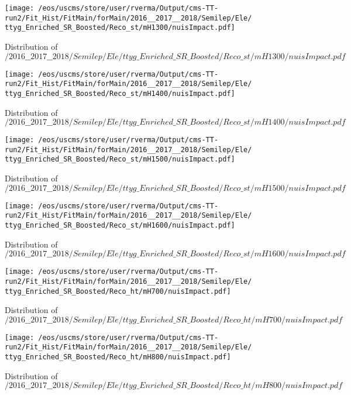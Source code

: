 \begin{figure}
\centering
\texttt{[image: /eos/uscms/store/user/rverma/Output/cms-TT-run2/Fit\_Hist/FitMain/forMain/2016\_\_2017\_\_2018/Semilep/Ele/ttyg\_Enriched\_SR\_Boosted/Reco\_st/mH1300/nuisImpact.pdf]}
\caption{Distribution of $/2016\_\_2017\_\_2018/Semilep/Ele/ttyg\_Enriched\_SR\_Boosted/Reco\_st/mH1300/nuisImpact.pdf$}
\end{figure}

\begin{figure}
\centering
\texttt{[image: /eos/uscms/store/user/rverma/Output/cms-TT-run2/Fit\_Hist/FitMain/forMain/2016\_\_2017\_\_2018/Semilep/Ele/ttyg\_Enriched\_SR\_Boosted/Reco\_st/mH1400/nuisImpact.pdf]}
\caption{Distribution of $/2016\_\_2017\_\_2018/Semilep/Ele/ttyg\_Enriched\_SR\_Boosted/Reco\_st/mH1400/nuisImpact.pdf$}
\end{figure}

\begin{figure}
\centering
\texttt{[image: /eos/uscms/store/user/rverma/Output/cms-TT-run2/Fit\_Hist/FitMain/forMain/2016\_\_2017\_\_2018/Semilep/Ele/ttyg\_Enriched\_SR\_Boosted/Reco\_st/mH1500/nuisImpact.pdf]}
\caption{Distribution of $/2016\_\_2017\_\_2018/Semilep/Ele/ttyg\_Enriched\_SR\_Boosted/Reco\_st/mH1500/nuisImpact.pdf$}
\end{figure}

\begin{figure}
\centering
\texttt{[image: /eos/uscms/store/user/rverma/Output/cms-TT-run2/Fit\_Hist/FitMain/forMain/2016\_\_2017\_\_2018/Semilep/Ele/ttyg\_Enriched\_SR\_Boosted/Reco\_st/mH1600/nuisImpact.pdf]}
\caption{Distribution of $/2016\_\_2017\_\_2018/Semilep/Ele/ttyg\_Enriched\_SR\_Boosted/Reco\_st/mH1600/nuisImpact.pdf$}
\end{figure}

\begin{figure}
\centering
\texttt{[image: /eos/uscms/store/user/rverma/Output/cms-TT-run2/Fit\_Hist/FitMain/forMain/2016\_\_2017\_\_2018/Semilep/Ele/ttyg\_Enriched\_SR\_Boosted/Reco\_ht/mH700/nuisImpact.pdf]}
\caption{Distribution of $/2016\_\_2017\_\_2018/Semilep/Ele/ttyg\_Enriched\_SR\_Boosted/Reco\_ht/mH700/nuisImpact.pdf$}
\end{figure}

\begin{figure}
\centering
\texttt{[image: /eos/uscms/store/user/rverma/Output/cms-TT-run2/Fit\_Hist/FitMain/forMain/2016\_\_2017\_\_2018/Semilep/Ele/ttyg\_Enriched\_SR\_Boosted/Reco\_ht/mH800/nuisImpact.pdf]}
\caption{Distribution of $/2016\_\_2017\_\_2018/Semilep/Ele/ttyg\_Enriched\_SR\_Boosted/Reco\_ht/mH800/nuisImpact.pdf$}
\end{figure}

